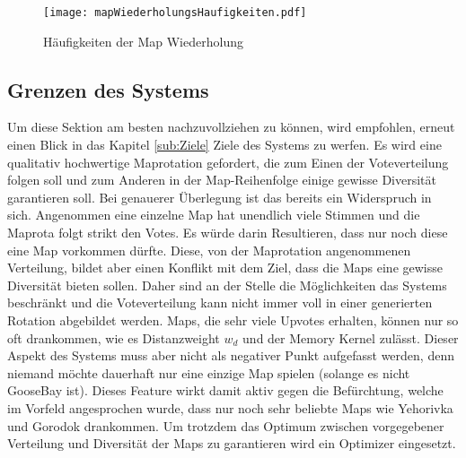             \begin{figure}[htbp]
                \centering
                \texttt{[image: mapWiederholungsHaufigkeiten.pdf]}
                \caption{Häufigkeiten der Map Wiederholung}
                \label{fig:haufigkeit_der_map_wiederholung}
            \end{figure}

    \subsection{Grenzen des Systems}
        \label{s:grenzen_des_systems}
        Um diese Sektion am besten nachzuvollziehen zu können, wird empfohlen, erneut einen Blick in das Kapitel \ref{sub:Ziele} Ziele des Systems zu
        werfen. Es wird eine qualitativ hochwertige Maprotation gefordert, die zum Einen der Voteverteilung folgen soll und
        zum Anderen in der Map-Reihenfolge einige gewisse Diversität garantieren soll. Bei genauerer Überlegung ist
        das bereits ein Widerspruch in sich. Angenommen eine einzelne Map hat unendlich viele Stimmen und die Maprota
        folgt strikt den Votes. Es würde darin Resultieren, dass nur noch diese eine Map vorkommen dürfte. Diese, von
        der Maprotation angenommenen Verteilung, bildet aber einen Konflikt mit dem Ziel, dass die Maps eine gewisse Diversität
        bieten sollen. Daher sind an der Stelle die Möglichkeiten das Systems beschränkt und die Voteverteilung kann
        nicht immer voll in einer generierten Rotation abgebildet werden. Maps, die sehr viele Upvotes erhalten, können nur so oft drankommen,
        wie es Distanzweight $w_d$ und der Memory Kernel zulässt. Dieser Aspekt des Systems muss aber nicht als negativer Punkt
        aufgefasst werden, denn niemand möchte dauerhaft nur eine einzige Map spielen (solange es nicht GooseBay ist).
        Dieses \glqq{}Feature\grqq{} wirkt damit aktiv gegen die Befürchtung, welche im Vorfeld angesprochen wurde,
        dass nur noch sehr beliebte Maps wie Yehorivka und Gorodok drankommen.
        Um trotzdem das Optimum zwischen vorgegebener Verteilung und Diversität der Maps zu garantieren wird ein Optimizer
        eingesetzt.\\
